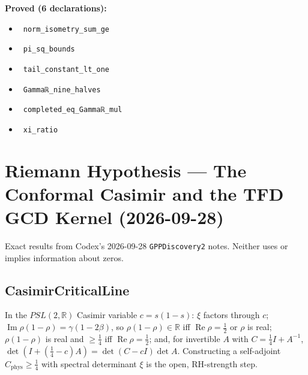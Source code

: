 \documentclass{report}
\theoremstyle{definition}
\begin{document}
\noindent\textbf{Proved (6 declarations):}
\begin{itemize}
  \item {}\leanok\ \texttt{norm\_isometry\_sum\_ge}
  \item {}\leanok\ \texttt{pi\_sq\_bounds}
  \item {}\leanok\ \texttt{tail\_constant\_lt\_one}
  \item {}\leanok\ \texttt{Gammaℝ\_nine\_halves}
  \item {}\leanok\ \texttt{completed\_eq\_Gammaℝ\_mul}
  \item {}\leanok\ \texttt{xi\_ratio}
\end{itemize}

\section{Riemann Hypothesis --- The Conformal Casimir and the TFD GCD Kernel (2026-09-28)}
Exact results from Codex's 2026-09-28 \texttt{GPPDiscovery2} notes. Neither uses or implies information about zeros.

\subsection{CasimirCriticalLine}
In the $PSL(2,\mathbb{R})$ Casimir variable $c=s(1-s)$: $\xi$ factors through $c$; $\operatorname{Im}\rho(1-\rho)=\gamma(1-2\beta)$, so $\rho(1-\rho)\in\mathbb{R}$ iff $\operatorname{Re}\rho=\tfrac12$ or $\rho$ is real; $\rho(1-\rho)$ is real and $\ge\tfrac14$ iff $\operatorname{Re}\rho=\tfrac12$; and, for invertible $A$ with $C=\tfrac14I+A^{-1}$, $\det(I+(\tfrac14-c)A)=\det(C-cI)\det A$. Constructing a self-adjoint $C_{\mathrm{phys}}\ge\tfrac14$ with spectral determinant $\xi$ is the open, RH-strength step.
\end{document}
